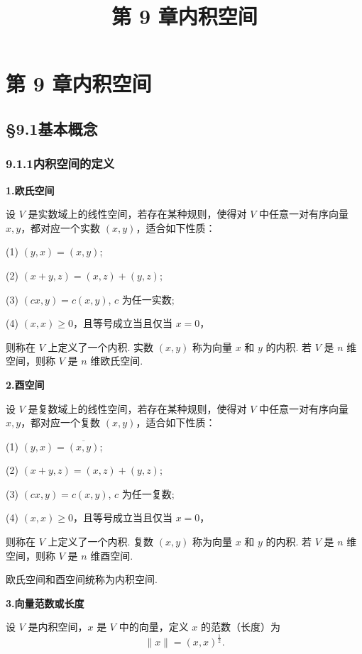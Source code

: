 \documentclass[UTF8,12pt,a4paper,fontset=fandol]{ctexart}
\title{第 9 章\quad 内积空间}
\author{}
\date{}
\begin{document}
\maketitle

\section*{第 9 章\quad 内积空间}

\subsection*{§9.1\quad 基本概念}

\subsubsection*{9.1.1\quad 内积空间的定义}

\noindent\textbf{1.\quad 欧氏空间}

设 $V$ 是实数域上的线性空间，若存在某种规则，使得对 $V$ 中任意一对有序向量 $x,y$，都对应一个实数 $(x,y)$，适合如下性质：

(1) $(y,x)=(x,y)$;

(2) $(x+y,z)=(x,z)+(y,z)$;

(3) $(cx,y)=c(x,y)$, $c$ 为任一实数;

(4) $(x,x)\ge 0$，且等号成立当且仅当 $x=0$，

则称在 $V$ 上定义了一个内积. 实数 $(x,y)$ 称为向量 $x$ 和 $y$ 的内积. 若 $V$ 是 $n$ 维空间，则称 $V$ 是 $n$ 维欧氏空间.

\noindent\textbf{2.\quad 酉空间}

设 $V$ 是复数域上的线性空间，若存在某种规则，使得对 $V$ 中任意一对有序向量 $x,y$，都对应一个复数 $(x,y)$，适合如下性质：

(1) $(y,x)=\overline{(x,y)}$;

(2) $(x+y,z)=(x,z)+(y,z)$;

(3) $(cx,y)=c(x,y)$, $c$ 为任一复数;

(4) $(x,x)\ge 0$，且等号成立当且仅当 $x=0$，

则称在 $V$ 上定义了一个内积. 复数 $(x,y)$ 称为向量 $x$ 和 $y$ 的内积. 若 $V$ 是 $n$ 维空间，则称 $V$ 是 $n$ 维酉空间.

欧氏空间和酉空间统称为内积空间.

\noindent\textbf{3.\quad 向量范数或长度}

设 $V$ 是内积空间，$x$ 是 $V$ 中的向量，定义 $x$ 的范数（长度）为
\[
\|x\|=(x,x)^{\frac12}.
\]
\end{document}
